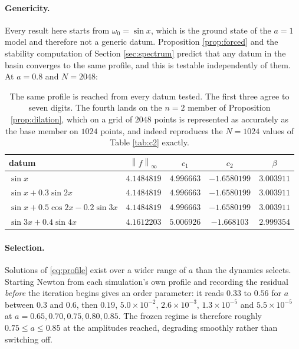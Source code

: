 \documentclass[11pt]{article}
\theoremstyle{definition}
\newcommand{\norm}[1]{\left\lVert #1 \right\rVert}
\begin{document}
\paragraph{Genericity.} Every result here starts from $\omega_0 = \sin x$,
which is the ground state of the $a=1$ model and therefore not a generic datum.
Proposition \ref{prop:forced} and the stability computation of Section
\ref{sec:spectrum} predict that any datum in the basin converges to the same
profile, and this is testable independently of them. At $a=0.8$ and $N=2048$:

\begin{table}[htbp]
\centering
\begin{tabular}{lcccc}
\toprule
datum & $\norm{f}_\infty$ & $c_1$ & $c_2$ & $\beta$\\
\midrule
$\sin x$                              & $4.1484819$ & $4.996663$
                                      & $-1.6580199$ & $3.003911$\\
$\sin x + 0.3\sin 2x$                 & $4.1484819$ & $4.996663$
                                      & $-1.6580199$ & $3.003911$\\
$\sin x + 0.5\cos 2x - 0.2\sin 3x$    & $4.1484819$ & $4.996663$
                                      & $-1.6580199$ & $3.003911$\\
$\sin 3x + 0.4\sin 4x$                & $4.1612203$ & $5.006926$
                                      & $-1.668103$ & $2.999354$\\
\bottomrule
\end{tabular}
\caption{The same profile is reached from every datum tested. The first three
agree to seven digits. The fourth lands on the $n=2$ member of Proposition
\ref{prop:dilation}, which on a grid of $2048$ points is represented as
accurately as the base member on $1024$ points, and indeed reproduces the
$N=1024$ values of Table \ref{tab:c2} exactly.}
\label{tab:generic}
\end{table}

\paragraph{Selection.} Solutions of \eqref{eq:profile} exist over a wider range
of $a$ than the dynamics selects. Starting Newton from each simulation's own
profile and recording the residual \emph{before} the iteration begins gives an
order parameter: it reads $0.33$ to $0.56$ for $a$ between $0.3$ and $0.6$,
then $0.19$, $5.0\times10^{-2}$, $2.6\times10^{-3}$, $1.3\times10^{-5}$ and
$5.5\times10^{-5}$ at $a = 0.65, 0.70, 0.75, 0.80, 0.85$. The frozen regime is
therefore roughly $0.75 \le a \le 0.85$ at the amplitudes reached, degrading
smoothly rather than switching off.
\end{document}
